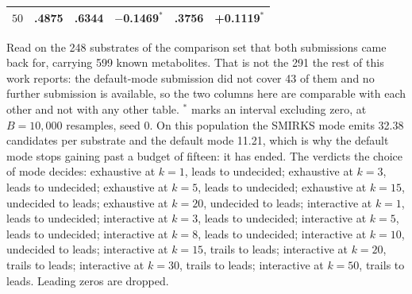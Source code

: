 \begin{table}[h]
\begin{threeparttable}
\begin{tabular}{rrrrrr}
$50$ & .4875 & .6344 & $-$0.1469$^{*}$ & .3756 & +0.1119$^{*}$ \\
\bottomrule
\end{tabular}
\begin{tablenotes}[flushleft]\footnotesize
\item Read on the 248 substrates of the comparison set that both submissions came back for, carrying 599 known metabolites. That is not the 291 the rest of this work reports: the default-mode submission did not cover 43 of them and no further submission is available, so the two columns here are comparable with each other and not with any other table. $^{*}$ marks an interval excluding zero, at $B = 10,000$ resamples, seed 0. On this population the SMIRKS mode emits 32.38 candidates per substrate and the default mode 11.21, which is why the default mode stops gaining past a budget of fifteen: it has ended. The verdicts the choice of mode decides: exhaustive at $k=1$, leads to undecided; exhaustive at $k=3$, leads to undecided; exhaustive at $k=5$, leads to undecided; exhaustive at $k=15$, undecided to leads; exhaustive at $k=20$, undecided to leads; interactive at $k=1$, leads to undecided; interactive at $k=3$, leads to undecided; interactive at $k=5$, leads to undecided; interactive at $k=8$, leads to undecided; interactive at $k=10$, undecided to leads; interactive at $k=15$, trails to leads; interactive at $k=20$, trails to leads; interactive at $k=30$, trails to leads; interactive at $k=50$, trails to leads. Leading zeros are dropped.
\end{tablenotes}
\end{threeparttable}
\end{table}
